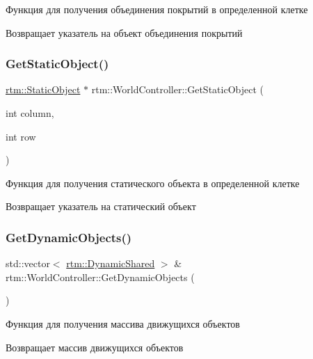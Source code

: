 Функция для получения объединения покрытий в определенной клетке \begin{DoxyReturn}{Возвращает}
указатель на объект объединения покрытий 
\end{DoxyReturn}
\mbox{\label{classrtm_1_1_world_controller_ae949e287815fd3327b04b4225255bcf1}} 
\subsubsection{\texorpdfstring{Get\+Static\+Object()}{GetStaticObject()}}
{\footnotesize\ttfamily \hyperlink{classrtm_1_1_static_object}{rtm\+::\+Static\+Object} $\ast$ rtm\+::\+World\+Controller\+::\+Get\+Static\+Object (\begin{DoxyParamCaption}\item[{int}]{column,  }\item[{int}]{row }\end{DoxyParamCaption})}

Функция для получения статического объекта в определенной клетке \begin{DoxyReturn}{Возвращает}
указатель на статический объект 
\end{DoxyReturn}
\mbox{\label{classrtm_1_1_world_controller_a3f1ea0c4cb853482e4b4681fb14f9b4f}} 
\subsubsection{\texorpdfstring{Get\+Dynamic\+Objects()}{GetDynamicObjects()}}
{\footnotesize\ttfamily std\+::vector$<$ \hyperlink{namespacertm_af668a936c29b476890a79ad1eb19e3cc}{rtm\+::\+Dynamic\+Shared} $>$ \& rtm\+::\+World\+Controller\+::\+Get\+Dynamic\+Objects (\begin{DoxyParamCaption}{ }\end{DoxyParamCaption})}

Функция для получения массива движущихся объектов \begin{DoxyReturn}{Возвращает}
массив движущихся объектов 
\end{DoxyReturn}
\mbox{\label{classrtm_1_1_world_controller_a028e4f7ab189c6ad5fe889ca375786e4}} 
